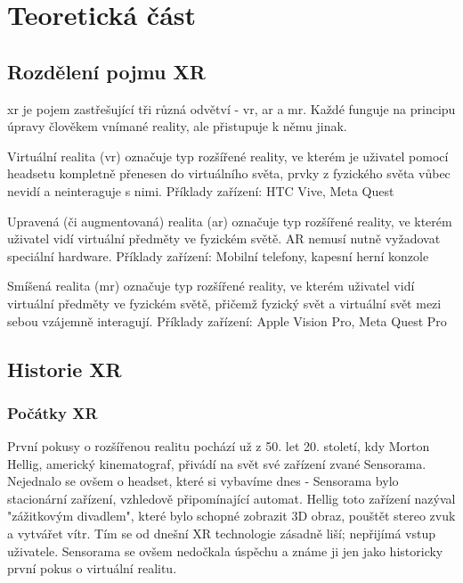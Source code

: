 \part{Teoretická část}

\chapter{Rozdělení pojmu XR}

\gls{xr} je pojem zastřešující tři různá odvětví - \gls{vr}, \gls{ar} a \gls{mr}. Každé funguje na principu úpravy člověkem vnímané reality, ale přistupuje k němu jinak.

Virtuální realita (\gls{vr}) označuje typ rozšířené reality, ve kterém je uživatel pomocí headsetu kompletně přenesen do virtuálního světa, prvky z fyzického světa vůbec nevidí a neinteraguje s nimi. Příklady zařízení: HTC Vive, Meta Quest

Upravená (či augmentovaná) realita (\gls{ar}) označuje typ rozšířené reality, ve kterém uživatel vidí virtuální předměty ve fyzickém světě. AR nemusí nutně vyžadovat speciální hardware. Příklady zařízení: Mobilní telefony, kapesní herní konzole

Smíšená realita (\gls{mr}) označuje typ rozšířené reality, ve kterém uživatel vidí virtuální předměty ve fyzickém světě, přičemž fyzický svět a virtuální svět mezi sebou vzájemně interagují. Příklady zařízení: Apple Vision Pro, Meta Quest Pro \cite{xr_disambiguation}

\chapter{Historie XR}

\section{Počátky XR}

První pokusy o rozšířenou realitu pochází už z 50. let 20. století, kdy Morton Hellig, americký kinematograf, přivádí na svět své zařízení zvané Sensorama. Nejednalo se ovšem o headset, které si vybavíme dnes - Sensorama bylo stacionární zařízení, vzhledově připomínající automat. Hellig toto zařízení nazýval "zážitkovým divadlem", které bylo schopné zobrazit 3D obraz, pouštět stereo zvuk a vytvářet vítr. Tím se od dnešní XR technologie zásadně liší; nepřijímá vstup uživatele. Sensorama se ovšem nedočkala úspěchu a známe ji jen jako historicky první pokus o virtuální realitu. \cite{otechnice}

